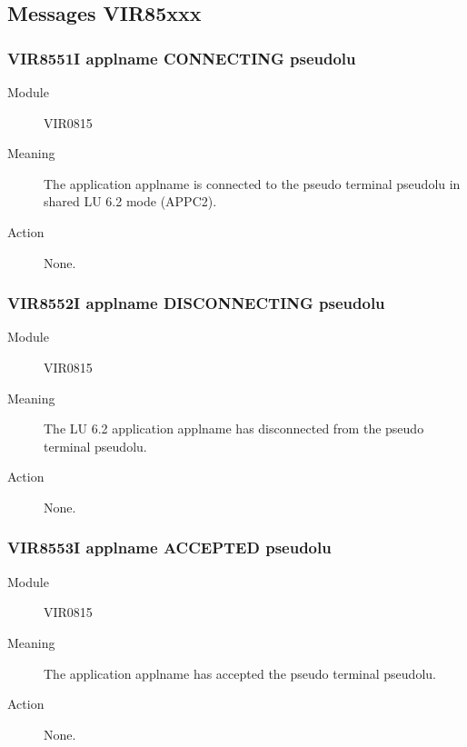 \documentclass[letterpaper,10pt,english]{sphinxmanual}
\begin{document}
\subsection{Messages VIR85xxx}
\label{\detokenize{messages:messages-vir85xxx}}

\subsubsection{VIR8551I applname CONNECTING pseudolu}
\label{\detokenize{messages:vir8551i-applname-connecting-pseudolu}}\begin{description}
\item[{Module}] \leavevmode
VIR0815

\item[{Meaning}] \leavevmode
The application applname is connected to the pseudo terminal pseudolu in shared LU 6.2 mode (APPC2).

\item[{Action}] \leavevmode
None.

\end{description}


\subsubsection{VIR8552I applname DISCONNECTING pseudolu}
\label{\detokenize{messages:vir8552i-applname-disconnecting-pseudolu}}\begin{description}
\item[{Module}] \leavevmode
VIR0815

\item[{Meaning}] \leavevmode
The LU 6.2 application applname has disconnected from the pseudo terminal pseudolu.

\item[{Action}] \leavevmode
None.

\end{description}


\subsubsection{VIR8553I applname ACCEPTED pseudolu}
\label{\detokenize{messages:vir8553i-applname-accepted-pseudolu}}\begin{description}
\item[{Module}] \leavevmode
VIR0815

\item[{Meaning}] \leavevmode
The application applname has accepted the pseudo terminal pseudolu.

\item[{Action}] \leavevmode
None.

\end{description}
\end{document}

